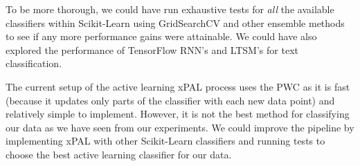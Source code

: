 To be more thorough, we could have run exhaustive tests for \textit{all} the available classifiers within Scikit-Learn using GridSearchCV and other ensemble methods to see if any more performance gains were attainable. We could have also explored the performance of TensorFlow RNN's and LTSM's for text classification.

The current setup of the active learning xPAL process uses the PWC as it is fast (because it updates only parts of the classifier with each new data point) and relatively simple to implement. However, it is not the best method for classifying our data as we have seen from our experiments. We could improve the pipeline by implementing xPAL with other Scikit-Learn classifiers and running tests to choose the best active learning classifier for our data.

